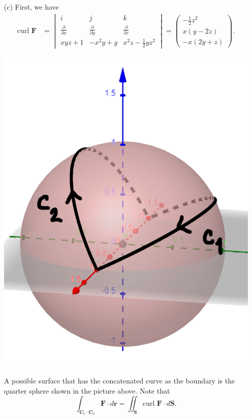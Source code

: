 \documentclass{article}
\begin{document}
\begin{enumerate}
\begin{enumerate}
    \newpage
    \item[(c)] First, we have
    \begin{align*}
        \text{curl } \textbf{F} &= \begin{vmatrix}i & j & k \\ \frac{\partial}{\partial x} & \frac{\partial}{\partial y} & \frac{\partial}{\partial z}\\xyz+1 & -x^2y+y & x^2z-\frac{1}{2}yz^2\end{vmatrix} = \begin{pmatrix}-\frac{1}{2}z^2 \\ x(y-2z) \\ -x(2y+z)\end{pmatrix}.
    \end{align*}
    \begin{center}
        \includegraphics[scale=0.5]{q8c.png}
    \end{center}
    
    A possible surface that has the concatenated curve as the boundary is the quarter sphere shown in the picture above. Note that
    \[\int_{\textbf{C}_1\cdot\textbf{C}_2}\textbf{F}\cdot d\textbf{r} = \iint_\textbf{S} \text{curl }\textbf{F}\cdot d\textbf{S}.\]
    

\end{enumerate}
\end{enumerate}
\end{document}
